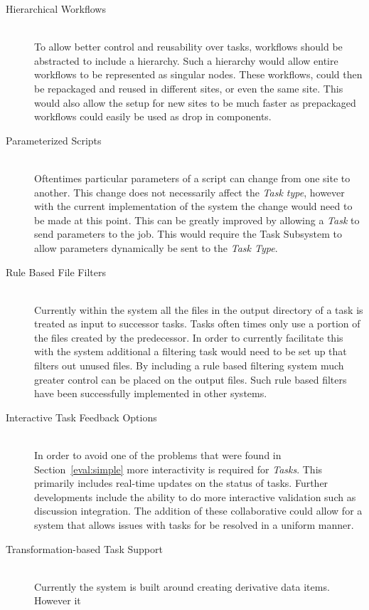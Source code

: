\documentclass[12pt,a4paper]{report}
\begin{document}
\begin{description}
\item[Hierarchical Workflows]\hfill \\
To allow better control and reusability over tasks, workflows should be
abstracted to include a hierarchy. Such a hierarchy would allow entire workflows
to be represented as singular nodes. These workflows, could then be repackaged
and reused in different sites, or even the same site. This would also allow the
setup for new sites to be much faster as prepackaged workflows could easily be
used as drop in components.
\item[Parameterized Scripts]\hfill \\
Oftentimes particular parameters of a script can change from one site to
another. This change does not necessarily affect the \emph{Task type}, however
with the current implementation of the system the change would need to be made
at this point. This can be greatly improved by allowing a \emph{Task} to send
parameters to the job. This would require the Task Subsystem to allow parameters
dynamically be sent to the \emph{Task Type}. 
\item[Rule Based File Filters]\hfill \\
Currently within the system all the files in the output directory of a task is
treated as input to successor tasks. Tasks often times only use a portion of the
files created by the predecessor. In order to currently facilitate this with the
system additional a filtering task would need to be set up that filters out
unused files. By including a rule based filtering system much greater control
can be placed on the output files. Such rule based filters have been
successfully implemented in other systems\cite{conery2005rule}.
\item[Interactive Task Feedback Options]\hfill \\
In order to avoid one of the problems that were found in Section~\ref{eval:simple}
more interactivity is required for \emph{Tasks}. This primarily includes
real-time updates on the status of tasks. Further developments include the
ability to do more interactive validation such as discussion integration.
The addition of these collaborative could allow for a system that allows issues
with tasks for be resolved in a uniform manner\cite{guimaraes1998integration}.
\item[Transformation-based Task Support]\hfill \\
Currently the system is built around creating derivative data items. However it

\end{description}
\end{document}
